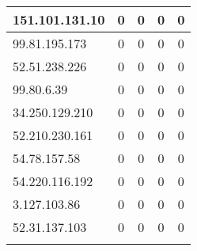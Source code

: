 \documentclass{article}
\begin{document}
\begin{longtable}{|>{\raggedright\arraybackslash}p{3cm}|c|c|c|c|}
    
    \rowcolor{lightgreen} %
    
    151.101.131.10 & 0 & 0 & 0 & 0 \\
    \hline
    
    
    \rowcolor{lightgreen} %
    
    99.81.195.173 & 0 & 0 & 0 & 0 \\
    \hline
    
    
    \rowcolor{lightgreen} %
    
    52.51.238.226 & 0 & 0 & 0 & 0 \\
    \hline
    
    
    \rowcolor{lightgreen} %
    
    99.80.6.39 & 0 & 0 & 0 & 0 \\
    \hline
    
    
    \rowcolor{lightgreen} %
    
    34.250.129.210 & 0 & 0 & 0 & 0 \\
    \hline
    
    
    \rowcolor{lightgreen} %
    
    52.210.230.161 & 0 & 0 & 0 & 0 \\
    \hline
    
    
    \rowcolor{lightgreen} %
    
    54.78.157.58 & 0 & 0 & 0 & 0 \\
    \hline
    
    
    \rowcolor{lightgreen} %
    
    54.220.116.192 & 0 & 0 & 0 & 0 \\
    \hline
    
    
    \rowcolor{lightgreen} %
    
    3.127.103.86 & 0 & 0 & 0 & 0 \\
    \hline
    
    
    \rowcolor{lightgreen} %
    
    52.31.137.103 & 0 & 0 & 0 & 0 \\
    \hline
    
    
    \rowcolor{lightgreen} %
    

\end{longtable}
\end{document}
